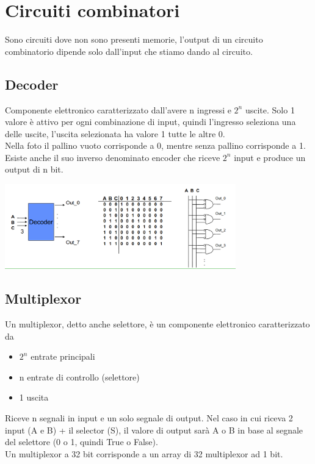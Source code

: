 \documentclass[12pt, a4paper, openany]{book}
\begin{document}
\chapter{Circuiti combinatori}
Sono circuiti dove non sono presenti memorie, l'output di un circuito combinatorio
dipende solo dall'input che stiamo dando al circuito.

\section{Decoder}
Componente elettronico caratterizzato dall'avere n ingressi e $2^n$ uscite.
Solo 1 valore è attivo per ogni combinazione di input, quindi l'ingresso seleziona 
una delle uscite, l'uscita selezionata ha valore 1 tutte le altre 0.
\\ Nella foto il pallino vuoto corrisponde a 0, mentre senza pallino corrisponde a 1.
Esiste anche il suo inverso denominato encoder che riceve $2^n$ input e produce un output
di n bit.

\begin{center}
    \includegraphics[width=100mm, scale=0.5]{Decoder.png}
\end{center}

\section{Multiplexor}
Un multiplexor, detto anche selettore, è un componente elettronico caratterizzato da
\begin{itemize}
    \item $2^n$ entrate principali
    \item n entrate di controllo (selettore)
    \item 1 uscita
\end{itemize}
Riceve n segnali in input e un solo segnale di output.
Nel caso in cui riceva 2 input (A e B) + il selector (S), il valore di output sarà A o B
in base al segnale del selettore (0 o 1, quindi True o False).
\\ Un multiplexor a 32 bit corrisponde a un array di 32 multiplexor ad 1 bit.
\end{document}
